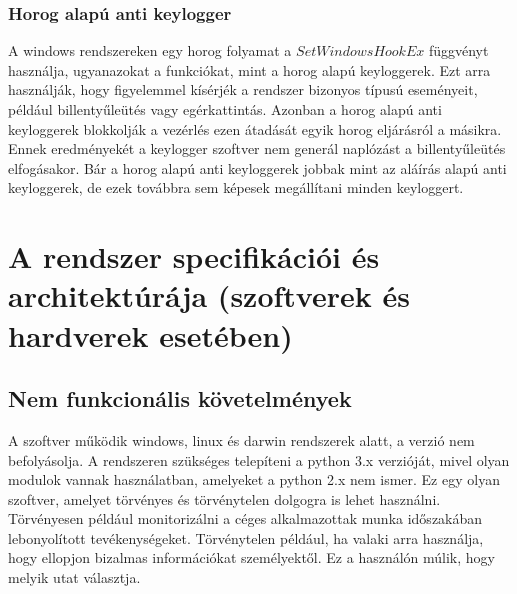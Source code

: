 \documentclass[a4paper, 11pt]{article}
\begin{document}
\subsubsection{Horog alapú anti keylogger}
\cite{tuli2013system} A windows rendszereken egy horog folyamat a $SetWindowsHookEx$ függvényt használja, ugyanazokat a funkciókat, mint a horog alapú keyloggerek. Ezt arra használják, hogy figyelemmel kísérjék a rendszer bizonyos típusú eseményeit, például billentyűleütés vagy egérkattintás. Azonban a horog alapú anti keyloggerek blokkolják a vezérlés ezen átadását egyik horog eljárásról a másikra. Ennek eredményekét a keylogger szoftver nem generál naplózást a billentyűleütés elfogásakor. Bár a horog alapú anti keyloggerek jobbak mint az aláírás alapú anti keyloggerek, de ezek továbbra sem képesek megállítani minden keyloggert.

\cleardoublepage
\section{A rendszer specifikációi és architektúrája (szoftverek és hardverek esetében)}\label{sec:specs_and_arch}

\subsection{Nem funkcionális követelmények}
A szoftver működik windows, linux és darwin rendszerek alatt, a verzió nem befolyásolja. A rendszeren szükséges telepíteni a python 3.x verzióját, mivel olyan modulok vannak használatban, amelyeket a python 2.x nem ismer. Ez egy olyan szoftver, amelyet törvényes és törvénytelen dolgogra is lehet használni. Törvényesen például monitorizálni a céges alkalmazottak munka időszakában lebonyolított tevékenységeket. Törvénytelen például, ha valaki arra használja, hogy ellopjon bizalmas információkat személyektől. Ez a használón múlik, hogy melyik utat választja.
\end{document}
